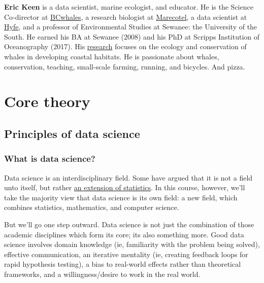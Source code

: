 \documentclass[
]{book}
\begin{document}
\textbf{Eric Keen} is a data scientist, marine ecologist, and educator. He is the Science Co-director at \href{www.bcwhales.org}{BCwhales}, a research biologist at \href{www.marecotel.org}{Marecotel}, a data scientist at \href{www.hyfe.ai}{Hyfe}, and a professor of Environmental Studies at Sewanee: the University of the South. He earned his BA at Sewanee (2008) and his PhD at Scripps Institution of Oceanography (2017). His \href{https://scholar.google.com/citations?hl=en\&user=SrLDYrEAAAAJ\&view_op=list_works\&sortby=pubdate}{research} focuses on the ecology and conservation of whales in developing coastal habitats. He is passionate about whales, conservation, teaching, small-scale farming, running, and bicycles. And pizza.

\hypertarget{part-core-theory}{%
\part{Core theory}\label{part-core-theory}}

\hypertarget{principles-of-data-science}{%
\chapter{Principles of data science}\label{principles-of-data-science}}

\hypertarget{what-is-data-science}{%
\section*{What is data science?}\label{what-is-data-science}}

Data science is an interdisciplinary field. Some have argued that it is not a field unto itself, but rather \href{https://www.statisticsviews.com/article/nate-silver-what-i-need-from-statisticians/}{an extension of statistics}. In this course, however, we'll take the majority view that data science is its own field: a new field, which combines statistics, mathematics, and computer science.

But we'll go one step outward. Data science is not just the combination of those academic disciplines which form its core; its also something more. Good data science involves domain knowledge (ie, familiarity with the problem being solved), effective communication, an iterative mentality (ie, creating feedback loops for rapid hypothesis testing), a bias to real-world effects rather than theoretical frameworks, and a willingness/desire to work in the real world.
\end{document}
